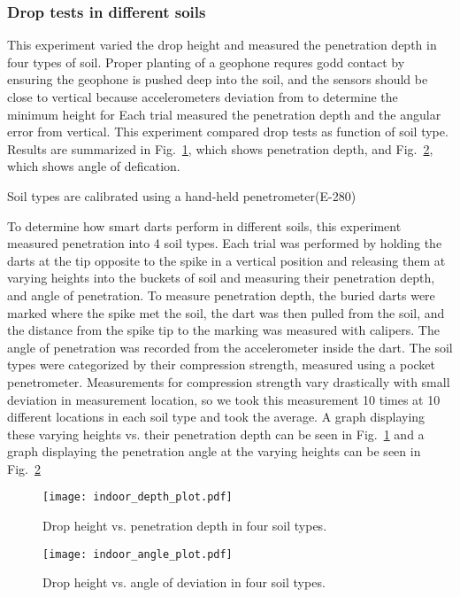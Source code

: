 \subsubsection{ Drop tests in different soils} 
This experiment varied the drop height and measured the penetration depth in four types of soil.
Proper planting of a geophone requres godd contact by ensuring the geophone is pushed deep into the soil, and the sensors should be close to vertical because accelerometers
deviation from 
 to determine the minimum height for
Each trial measured the penetration depth and the angular error from vertical.
This experiment compared drop tests as function of soil type.  
Results are summarized in Fig.~\ref{fig:DepthPlotIndoors}, which shows penetration depth, and Fig.~\ref{fig:AnglePlotIndoors}, which shows angle of defication.

Soil types are calibrated using a hand-held penetrometer(E-280)

To determine how smart darts perform in different soils, this experiment measured penetration into 4 soil types.  Each trial was performed by holding the darts at the tip opposite to the spike in a vertical position and releasing them at varying heights into the buckets of soil and measuring their penetration depth, and angle of penetration. To measure penetration depth, the buried darts were marked where the spike met the soil, the dart was then pulled from the soil, and the distance from the spike tip to the marking was measured with calipers. The angle of penetration was recorded from the accelerometer inside the dart. The soil types were categorized by their compression strength, measured using a pocket penetrometer. Measurements for compression strength vary drastically with small deviation in measurement location, so we took this measurement 10 times at 10 different locations in each soil type and took the average. A graph displaying these varying heights vs. their penetration depth can be seen in Fig.~\ref{fig:DepthPlotIndoors} and a graph displaying the penetration angle at the varying heights can be seen in Fig.\ \ref{fig:AnglePlotIndoors}

\begin{figure} \centering
{\texttt{[image: indoor\_depth\_plot.pdf]}}
\caption{Drop height vs. penetration depth in four soil types.} 
\label{fig:DepthPlotIndoors}
\end{figure}

\begin{figure} \centering
{\texttt{[image: indoor\_angle\_plot.pdf]}}
\caption{Drop height vs. angle of deviation in four soil types.} 
\label{fig:AnglePlotIndoors}
\vspace{-1em}
\end{figure}

